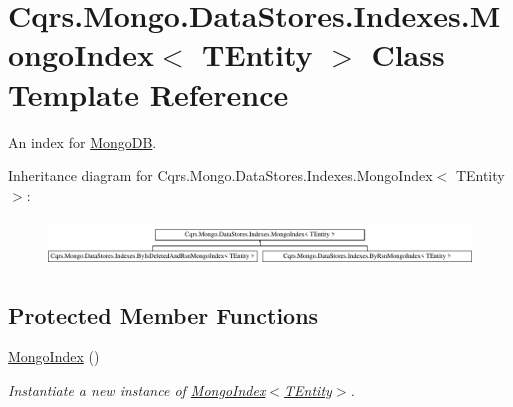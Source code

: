 \hypertarget{classCqrs_1_1Mongo_1_1DataStores_1_1Indexes_1_1MongoIndex}{}\section{Cqrs.\+Mongo.\+Data\+Stores.\+Indexes.\+Mongo\+Index$<$ T\+Entity $>$ Class Template Reference}
\label{classCqrs_1_1Mongo_1_1DataStores_1_1Indexes_1_1MongoIndex}


An index for \hyperlink{namespaceCqrs_1_1MongoDB}{Mongo\+DB}.  


Inheritance diagram for Cqrs.\+Mongo.\+Data\+Stores.\+Indexes.\+Mongo\+Index$<$ T\+Entity $>$\+:\begin{figure}[H]
\begin{center}
\leavevmode
\includegraphics[height=1.250000cm]{classCqrs_1_1Mongo_1_1DataStores_1_1Indexes_1_1MongoIndex}
\end{center}
\end{figure}
\subsection*{Protected Member Functions}
\begin{DoxyCompactItemize}
\item 
\hyperlink{classCqrs_1_1Mongo_1_1DataStores_1_1Indexes_1_1MongoIndex_a7affbb063520cd8c8bda27f8478efd06_a7affbb063520cd8c8bda27f8478efd06}{Mongo\+Index} ()
\begin{DoxyCompactList}\small\item\em Instantiate a new instance of \hyperlink{classCqrs_1_1Mongo_1_1DataStores_1_1Indexes_1_1MongoIndex_a7affbb063520cd8c8bda27f8478efd06_a7affbb063520cd8c8bda27f8478efd06}{Mongo\+Index$<$\+T\+Entity$>$}. \end{DoxyCompactList}\end{DoxyCompactItemize}
